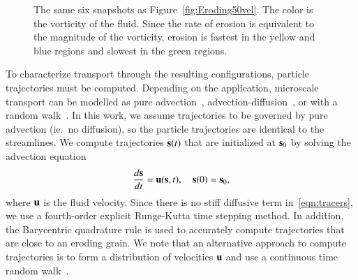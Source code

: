 \documentclass[preprint,10pt]{elsarticle}
\begin{document}
\begin{figure}[H]
\begin{center}
\caption{\label{fig:Eroding50vort} The same six snapshots as
Figure~\ref{fig:Eroding50vel}.  The color is the vorticity of the fluid.
Since the rate of erosion is equivalent to the magnitude of the
vorticity, erosion is fastest in the yellow and blue regions and slowest
in the green regions.}
\end{center}
\end{figure}

To characterize transport through the resulting configurations, particle
trajectories must be computed. Depending on the application, microscale
transport can be modelled as pure advection~\cite{dea-qua-bir-jua2018,
leb-ded-dav-bou2007, cve-che-wen1996, puy-gou-den2019},
advection-diffusion~\cite{cus-hu-den1995, dag1987, den-ica-hid2018}, or
with a random walk~\cite{saf1959, bij-blu2006, ber-sch-sil2000}.  In
this work, we assume trajectories to be governed by pure advection
(ie.~no diffusion), so the particle trajectories are identical to the
streamlines. We compute trajectories $\ss(t)$ that are initialized at
$\ss_0$ by solving the advection equation
\begin{align}
  \frac{d\ss}{dt} = \uu(\ss,t), \quad \ss(0) = \ss_0,
  \label{eqn:tracers}
\end{align}
where $\uu$ is the fluid velocity.  Since there is no stiff diffusive
term in~\eqref{eqn:tracers}, we use a fourth-order explicit Runge-Kutta
time stepping method.  In addition, the Barycentric quadrature rule is
used to accurately compute trajectories that are close to an eroding
grain. We note that an alternative approach to compute trajectories is
to form a distribution of velocities $\uu$ and use a continuous time
random walk~\cite{mon-wei1965, den-cor-sch-ber2004, leb-den-car2008,
ber-cor-den-sch2006}.  
\end{document}
